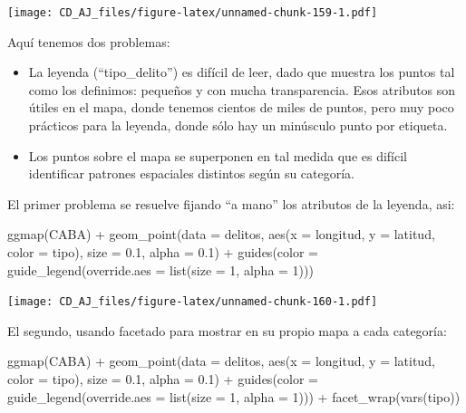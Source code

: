 \documentclass[
]{book}
\newenvironment{Shaded}{\begin{snugshade}}{\end{snugshade}}
\newcommand{\AttributeTok}[1]{\textcolor[rgb]{0.77,0.63,0.00}{#1}}
\newcommand{\DecValTok}[1]{\textcolor[rgb]{0.00,0.00,0.81}{#1}}
\newcommand{\FloatTok}[1]{\textcolor[rgb]{0.00,0.00,0.81}{#1}}
\newcommand{\FunctionTok}[1]{\textcolor[rgb]{0.00,0.00,0.00}{#1}}
\newcommand{\NormalTok}[1]{#1}
\newcommand{\SpecialCharTok}[1]{\textcolor[rgb]{0.00,0.00,0.00}{#1}}
\begin{document}
\texttt{[image: CD\_AJ\_files/figure-latex/unnamed-chunk-159-1.pdf]}

Aquí tenemos dos problemas:

\begin{itemize}
\item
  La leyenda (``tipo\_delito'') es difícil de leer, dado que muestra los puntos tal como los definimos: pequeños y con mucha transparencia. Esos atributos son útiles en el mapa, donde tenemos cientos de miles de puntos, pero muy poco prácticos para la leyenda, donde sólo hay un minúsculo punto por etiqueta.
\item
  Los puntos sobre el mapa se superponen en tal medida que es difícil identificar patrones espaciales distintos según su categoría.
\end{itemize}

El primer problema se resuelve fijando ``a mano'' los atributos de la leyenda, asi:

\begin{Shaded}
\begin{Highlighting}[]
\FunctionTok{ggmap}\NormalTok{(CABA) }\SpecialCharTok{+}
    \FunctionTok{geom\_point}\NormalTok{(}\AttributeTok{data =}\NormalTok{ delitos,}
               \FunctionTok{aes}\NormalTok{(}\AttributeTok{x =}\NormalTok{ longitud, }\AttributeTok{y =}\NormalTok{ latitud, }\AttributeTok{color =}\NormalTok{ tipo),}
               \AttributeTok{size =} \FloatTok{0.1}\NormalTok{, }\AttributeTok{alpha =} \FloatTok{0.1}\NormalTok{) }\SpecialCharTok{+}
    \FunctionTok{guides}\NormalTok{(}\AttributeTok{color =} \FunctionTok{guide\_legend}\NormalTok{(}\AttributeTok{override.aes =} \FunctionTok{list}\NormalTok{(}\AttributeTok{size =} \DecValTok{1}\NormalTok{, }\AttributeTok{alpha =} \DecValTok{1}\NormalTok{)))}
\end{Highlighting}
\end{Shaded}

\texttt{[image: CD\_AJ\_files/figure-latex/unnamed-chunk-160-1.pdf]}

El segundo, usando facetado para mostrar en su propio mapa a cada categoría:

\begin{Shaded}
\begin{Highlighting}[]
\FunctionTok{ggmap}\NormalTok{(CABA) }\SpecialCharTok{+}
    \FunctionTok{geom\_point}\NormalTok{(}\AttributeTok{data =}\NormalTok{ delitos,}
               \FunctionTok{aes}\NormalTok{(}\AttributeTok{x =}\NormalTok{ longitud, }\AttributeTok{y =}\NormalTok{ latitud, }\AttributeTok{color =}\NormalTok{ tipo),}
               \AttributeTok{size =} \FloatTok{0.1}\NormalTok{, }\AttributeTok{alpha =} \FloatTok{0.1}\NormalTok{) }\SpecialCharTok{+}
    \FunctionTok{guides}\NormalTok{(}\AttributeTok{color =} \FunctionTok{guide\_legend}\NormalTok{(}\AttributeTok{override.aes =} \FunctionTok{list}\NormalTok{(}\AttributeTok{size =} \DecValTok{1}\NormalTok{, }\AttributeTok{alpha =} \DecValTok{1}\NormalTok{))) }\SpecialCharTok{+}
    \FunctionTok{facet\_wrap}\NormalTok{(}\FunctionTok{vars}\NormalTok{(tipo))}
\end{Highlighting}
\end{Shaded}
\end{document}
